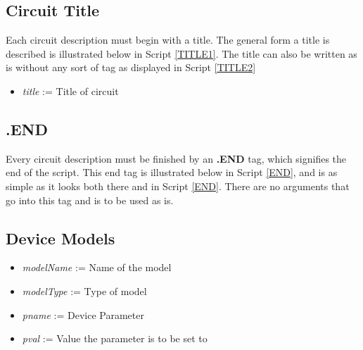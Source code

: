 \documentclass{article}
\begin{document}
\subsection{Circuit Title}
Each circuit description must begin with a title. The general form a title is described is illustrated below in Script \ref{TITLE1}. The title can also be written as is without any sort of tag as displayed in Script \ref{TITLE2}
\begin{center}
\end{center}

\begin{center}
\end{center}

\begin{itemize}
\item \textit{title} := Title of circuit
\end{itemize}
\subsection{.END}
Every circuit description must be finished by an \textbf{.END} tag, which signifies the end of the script. This end tag is illustrated below in Script \ref{END}, and is as simple as it looks both there and in Script \ref{END}. There are no arguments that go into this tag and is to be used as is.

\begin{center}
\end{center}

\cleardoublepage
\subsection{Device Models}

\begin{center}

\begin{itemize}
\item \textit{modelName} := Name of the model
\item \textit{modelType} := Type of model
\item \textit{pname} := Device Parameter 
\item \textit{pval} := Value the parameter is to be set to
\end{itemize}
\end{center}
\end{document}
